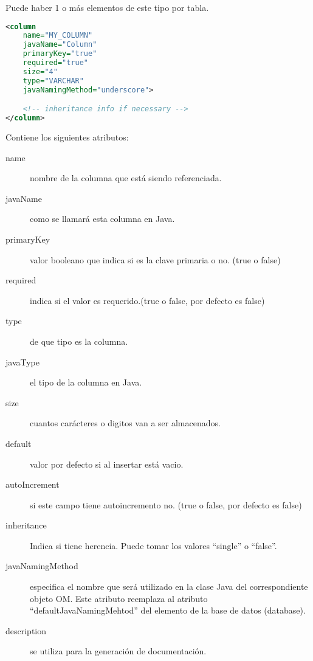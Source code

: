 Puede haber 1 o más elementos de este tipo por tabla.

\begin{lstlisting}[language=xml]
<column
	name="MY_COLUMN"
	javaName="Column"
	primaryKey="true"
	required="true"
	size="4"
	type="VARCHAR"
	javaNamingMethod="underscore">

	<!-- inheritance info if necessary -->
</column>
\end{lstlisting}

Contiene los siguientes atributos:

\begin{description}
	\item[name] nombre de la columna que está siendo referenciada.
	\item[javaName] como se llamará esta columna en Java.
	\item[primaryKey] valor booleano que indica si es la clave primaria o no. (true o false)
	\item[required] indica si el valor es requerido.(true o false, por defecto es false)
	\item[type] de que tipo es la columna.
	\item[javaType] el tipo de la columna en Java.
	\item[size] cuantos carácteres o digitos van a ser almacenados.
	\item[default] valor por defecto si al insertar está vacio.
	\item[autoIncrement] si este campo tiene autoincremento no. (true o false, por defecto es false)
	\item[inheritance] Indica si tiene herencia. Puede tomar los valores “single” o “false”.
	\item[javaNamingMethod] especifica el nombre que será utilizado en la clase Java del correspondiente objeto OM. Este atributo reemplaza al atributo “defaultJavaNamingMehtod” del elemento de la base de datos (database).
	\item[description] se utiliza para la generación de documentación.
\end{description}